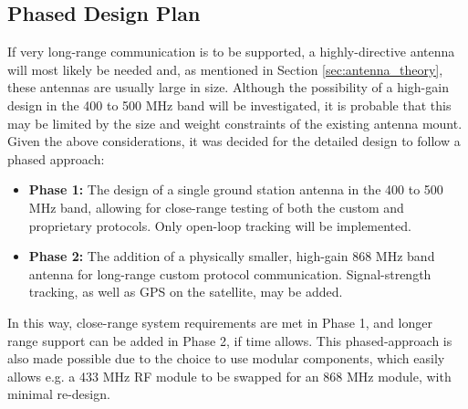 \newpage
\subsection{Phased Design Plan}
If very long-range communication is to be supported, a highly-directive antenna will most likely be needed and, as mentioned in Section \ref{sec:antenna_theory}, these antennas are usually large in size. Although the possibility of a high-gain design in the 400 to 500 MHz band will be investigated, it is probable that this may be limited by the size and weight constraints of the existing antenna mount. Given the above considerations, it was decided for the detailed design to follow a phased approach:
\begin{itemize}
  \item \textbf{Phase 1:} The design of a single ground station antenna in the 400 to 500 MHz band, allowing for close-range testing of both the custom and proprietary protocols. Only open-loop tracking will be implemented.
  \item \textbf{Phase 2:} The addition of a physically smaller, high-gain 868 MHz band antenna for long-range custom protocol communication. Signal-strength tracking, as well as GPS on the satellite, may be added.
\end{itemize}

\noindent In this way, close-range system requirements are met in Phase 1, and longer range support can be added in Phase 2, if time allows. This phased-approach is also made possible due to the choice to use modular components, which easily allows e.g. a 433 MHz RF module to be swapped for an 868 MHz module, with minimal re-design.